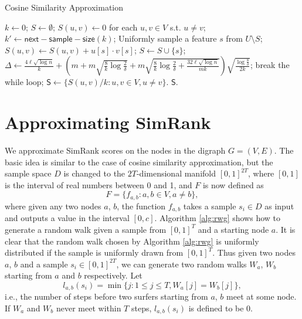 \documentclass{article}
\begin{document}
\begin{algorithm}[!t]
\caption{\textsf{Cosine Similarity Approximation}}
\label{alg:csa}
\renewcommand{\algorithmicrequire}{\textbf{Input:}}
\renewcommand{\algorithmicensure}{\textbf{Output:}}
\begin{algorithmic}
\State $k \gets 0$;
\State $S \gets \emptyset$;
\State $S(u,v) \gets 0$ for each $u, v \in V$ s.t. $u\not= v$;
	\State $k' \gets \mathsf{next-sample-size}(k)$;
		\State Uniformly sample a feature $s$ from $U\setminus S$;
		\State $S(u,v) \gets S(u,v)+u[s]\cdot v[s]$;
		\State $S \gets S\cup \{s\}$;
	\EndFor
	\State $\Delta \gets \frac{4\ell\sqrt{\log n}}{k} +\left(m+m\sqrt{\frac{8}{k}\log \frac{2}{\delta}} + m\sqrt{\frac{8}{k}\log \frac{2}{\delta} + \frac{32\ell\sqrt{\log n}}{mk}}\right)\sqrt{\frac{\log \frac{8}{\delta}}{2k}}$;
	\If {$\Delta \leq \epsilon$}
		\State break the while loop;
	\EndIf
\EndWhile
\State $\mathsf{S} \gets \{S(u,v)/k : u,v\in V, u\not=v\}$.
 $\mathsf{S}$.
\end{algorithmic}
\end{algorithm}

\section{Approximating SimRank}
We approximate SimRank scores on the nodes in the digraph $G=(V,E)$. 
The basic idea is similar to the case of cosine similarity approximation, but the sample space $D$ is changed to the $2T$-dimensional manifold $[0,1]^{2T}$, where $[0,1]$ is the interval of real numbers between 0 and 1, and $F$ is now defined as
$$F = \{f_{a,b} : a,b\in V, a\not= b\},$$
where given any two nodes $a$, $b$, the function $f_{a,b}$ takes a sample $s_i\in D$ as input and outputs a value in the interval $[0,c]$. Algorithm \ref{alg:rwg} shows how to generate a random walk given a sample from $[0,1]^T$ and a starting node $a$. It is clear that the random walk chosen by Algorithm \ref{alg:rwg} is uniformly distributed if the sample is uniformly drawn from $[0,1]^T$. Thus given two nodes $a$, $b$ and a sample $s_i \in [0,1]^{2T}$, we can generate two random walks $W_a$, $W_b$ starting from $a$ and $b$ respectively. Let 
$$l_{a,b}(s_i) = \min\{j: 1\leq j\leq T, W_a[j] = W_b[j]\},$$
i.e., the number of steps before two surfers starting from $a$, $b$ meet at some node. If $W_a$ and $W_b$ never meet within $T$ steps, $l_{a,b}(s_i)$ is defined to be 0.
\end{document}
